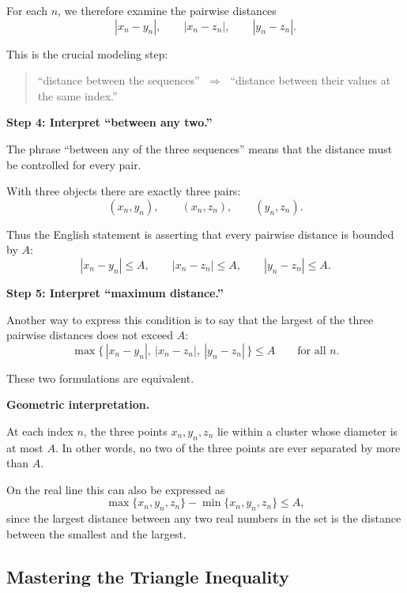 \begin{remark*}
For each $n$, we therefore examine the pairwise distances
\[
|x_n-y_n|, \qquad |x_n-z_n|, \qquad |y_n-z_n|.
\]

This is the crucial modeling step:

\begin{quote}
``distance between the sequences''
$\;\Rightarrow\;$
``distance between their values at the same index.''
\end{quote}

\medskip

\textbf{Step 4: Interpret ``between any two.''}

The phrase ``between any of the three sequences'' means that the
distance must be controlled for every pair.

With three objects there are exactly three pairs:
\[
(x_n,y_n), \qquad (x_n,z_n), \qquad (y_n,z_n).
\]

Thus the English statement is asserting that every pairwise distance
is bounded by $A$:
\[
|x_n-y_n| \le A, \qquad
|x_n-z_n| \le A, \qquad
|y_n-z_n| \le A .
\]

\medskip

\textbf{Step 5: Interpret ``maximum distance.''}

Another way to express this condition is to say that the largest of the
three pairwise distances does not exceed $A$:
\[
\max\{\,|x_n-y_n|,\ |x_n-z_n|,\ |y_n-z_n|\,\} \le A
\qquad \text{for all } n .
\]

These two formulations are equivalent.

\medskip

\textbf{Geometric interpretation.}

At each index $n$, the three points $x_n, y_n, z_n$ lie within a cluster
whose diameter is at most $A$.  In other words, no two of the three
points are ever separated by more than $A$.

On the real line this can also be expressed as
\[
\max\{x_n,y_n,z_n\} - \min\{x_n,y_n,z_n\} \le A ,
\]
since the largest distance between any two real numbers in the set is
the distance between the smallest and the largest.

\end{remark*}




\subsection{Mastering the Triangle Inequality}
\label{sec:triangle-inequality-toolkit}

